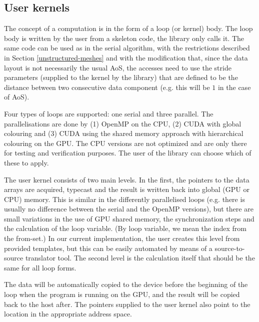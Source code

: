 

\subsection{User kernels}




The concept of a computation is in the form of a loop (or kernel) body. The loop
body is written by the user from a skeleton code, the library only calls it. The
same code can be used as in the serial algorithm, with the restrictions
described in Section \ref{unstructured-meshes} and with the modification that,
since the data layout is not necessarily the usual AoS, the accesses need to use
the stride parameters (supplied to the kernel by the library) that are defined
to be the distance between two consecutive data component (e.g. this will be $1$
in the case of AoS).

Four types of loops are supported: one serial and three parallel. The
parallelisations are done by (1) OpenMP on the CPU, (2) CUDA with global
colouring and (3) CUDA using the shared memory approach with hierarchical
colouring on the GPU. The CPU versions are not optimized and are only there for
testing and verification purposes. The user of the library can choose which of
these to apply.

The user kernel consists of two main levels. In the first, the pointers to the
data arrays are acquired, typecast and the result is written back into global
(GPU or CPU) memory. This is similar in the differently parallelised loops (e.g.
there is usually no difference between the serial and the OpenMP versions), but
there are small variations in the use of GPU shared memory, the synchronization
steps and the calculation of the loop variable. (By loop variable, we mean the
index from the from-set.) In our current implementation, the user creates this
level from provided templates, but this can be easily automated by means of a
source-to-source translator tool. The second level is the calculation itself
that should be the same for all loop forms.

The data will be automatically copied to the device before the beginning of the
loop when the program is running on the GPU, and the result will be copied back
to the host after. The pointers supplied to the user kernel also point to the
location in the appropriate address space.

